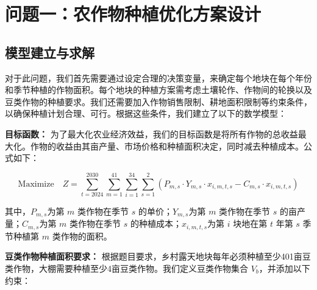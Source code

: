 

\section[\hspace{-2pt}问题一：农作物种植优化方案设计]{{\heiti{} \hspace{-8pt}问题一：农作物种植优化方案设计}}\label{section3: 问题1：农作物种植优化方案设计}

\subsection[\hspace{-2pt}模型建立与求解]{{\heiti{} \hspace{-8pt}模型建立与求解}}\label{section3: 模型建立与求解}

对于此问题，我们首先需要通过设定合理的决策变量，来确定每个地块在每个年份和季节种植的作物面积。每个地块的种植方案需考虑土壤轮作、作物间的轮换以及豆类作物的种植要求。我们还需要加入作物销售限制、耕地面积限制等约束条件，以确保种植计划合理、可行。根据这些条件，我们建立了以下的数学模型：

\textbf{目标函数：}  
为了最大化农业经济效益，我们的目标函数是将所有作物的总收益最大化。作物的收益由其亩产量、市场价格和种植面积决定，同时减去种植成本。公式如下：

\begin{equation}
  \text{Maximize}\quad Z = \sum_{t=2024}^{2030} \sum_{m=1}^{41} \sum_{i=1}^{34} \sum_{s=1}^{2} \left( P_{m,s} \cdot Y_{m,s} \cdot x_{i,m,t,s} - C_{m,s} \cdot x_{i,m,t,s} \right)
\end{equation}

其中，$P_{m,s}$为第 $m$ 类作物在季节 $s$ 的单价；$Y_{m,s}$为第 $m$ 类作物在季节 $s$ 的亩产量；$C_{m,s}$为第 $m$ 类作物在季节 $s$ 的种植成本；$x_{i,m,t,s}$为第 $i$ 块地在第 $t$ 年第 $s$ 季节种植第 $m$ 类作物的面积。

\textbf{豆类作物种植面积要求：}  
根据题目要求，乡村露天地块每年必须种植至少401亩豆类作物，大棚需要种植至少4亩豆类作物。我们定义豆类作物集合 $V_b$，并添加以下约束：

